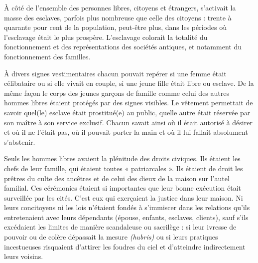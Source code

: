 À côté de l'ensemble des personnes libres, citoyens et étrangers,
s'activait la masse des esclaves, parfois plus nombreuse que celle des citoyens :
 trente à quarante pour cent de la population, peut-être plus, dans
les périodes où l'esclavage était le plus prospère. L'esclavage colorait la
totalité du fonctionnement et des représentations des sociétés antiques,
et notamment du fonctionnement des familles.

À divers signes vestimentaires chacun pouvait repérer si une
femme était célibataire ou si elle vivait en couple, si une jeune fille était
libre ou esclave. De la même façon le corps des jeunes garçons de famille
comme celui des autres hommes libres étaient protégés par des signes visibles.
Le vêtement permettait de savoir quel(le) esclave était prostitué(e)
au public, quelle autre était réservée par son maître à son service exclusif.
Chacun savait ainsi où il était autorisé à désirer et où il ne l'était pas, où il
pouvait porter la main et où il lui fallait absolument s'abstenir.

Seuls les hommes libres avaient la plénitude des droits civiques. Ils
étaient les chefs de leur famille, qui étaient toutes « patriarcales ».
Ils étaient de droit les prêtres du culte des ancêtres et de celui des dieux
de la maison sur l'autel familial. Ces cérémonies étaient si importantes
que leur bonne exécution était surveillée par les cités. C'est eux qui exerçaient
la justice dans leur maison. Ni leurs concitoyens ni les lois
n'étaient fondés à s'immiscer dans les relations qu'ils entretenaient avec
leurs dépendants (épouse, enfants, esclaves, clients), sauf s'ils excédaient
les limites de manière scandaleuse ou sacrilège : si leur ivresse de pouvoir
ou de colère dépassait la mesure \emph{(hubris)} ou si leurs pratiques incestueuses
risquaient d'attirer les foudres du ciel et d'atteindre indirectement leurs
voisins.

